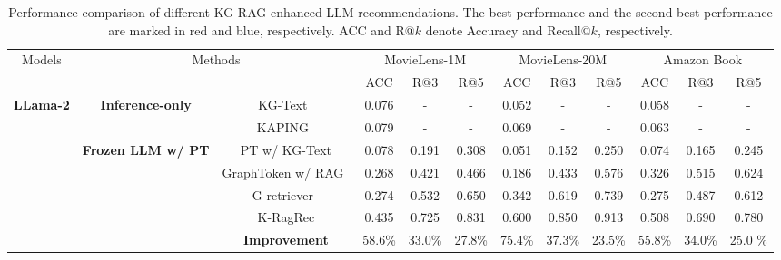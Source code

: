 
\begin{table}[t]
\centering
\vskip -0.150in
  \caption{Performance comparison of different KG RAG-enhanced LLM recommendations. 
  The \colorbox{backred!50}{best performance} and the \colorbox{backblue!75}{second-best performance} are marked in red and blue, respectively. ACC and R@$k$ denote
Accuracy and Recall@$k$, respectively.}
  \vskip -0.05in
    \scalebox{0.6}
{
  \begin{adjustbox}{}
    \begin{tabular}{c|c|c|c|c|c|c|c|c|c|c|c}
    \toprule
    \toprule
    \multirow{2}{*}{Models}  & \multicolumn{2}{c|}{\multirow{2}{*}{Methods}} & \multicolumn{3}{c|}{MovieLens-1M}  & \multicolumn{3}{c|}{MovieLens-20M} & \multicolumn{3}{c}{Amazon Book} \\
    \cmidrule{4-12}
    & \multicolumn{2}{c|}{} & \multicolumn{1}{c|}{ACC} & \multicolumn{1}{c|}{R@3} & \multicolumn{1}{c|}{R@5}& \multicolumn{1}{c|}{ACC} & \multicolumn{1}{c|}{R@3} & \multicolumn{1}{c|}{R@5} & \multicolumn{1}{c|}{ACC} & \multicolumn{1}{c|}{R@3} & \multicolumn{1}{c}{R@5} \\
\midrule
    \multirow{10}{*}{\textbf{LLama-2}}&   \multirow{2}{*}{\textbf{Inference-only}} 
    & KG-Text~\citep{wu2023retrieve}& 0.076  & - & -  & 0.052 &  - &  -  &  0.058  &  -  &  -   \\
    & &KAPING~\citep{baek2023knowledge} & 0.079  & -  & - & 0.069 &  - &  -  & 0.063  &   - &   -  \\
    \cmidrule{2-12}
    &\multirow{5}{*}{\textbf{Frozen LLM w/ PT}} &PT w/ KG-Text& 0.078  & 0.191  & 0.308 &0.051  &0.152 &0.250   &0.074   &0.165   &0.245   \\
    & &GraphToken w/ RAG~\citep{perozzi2024let} & 0.268  &  0.421 & 0.466 & 0.186 &0.433 &0.576   &0.326   & 0.515  & 0.624   \\
    & &G-retriever~\citep{he2024g} &  0.274 & 0.532  & 0.650 & 0.342 &0.619  &0.739   &0.275   &0.487   &0.612 \\
     & & K-RagRec & \colorbox{backblue!75}{0.435}  &  \colorbox{backblue!75}{0.725} & 0.831 &0.600  & \colorbox{backblue!75}{0.850} & \colorbox{backblue!75}{0.913}  &  \colorbox{backblue!75}{0.508}  & \colorbox{backblue!75}{0.690}  &  \colorbox{backblue!75}{0.780} \\
    \cmidrule{3-12}
    && \cellcolor{verylightgray} \textbf{Improvement} & \cellcolor{verylightgray}58.6\%  & \cellcolor{verylightgray}33.0\% & \cellcolor{verylightgray}27.8\%  & \cellcolor{verylightgray}75.4\% &  \cellcolor{verylightgray}37.3\% &  \cellcolor{verylightgray}23.5\%  &  \cellcolor{verylightgray}55.8\%  & \cellcolor{verylightgray}34.0\%   &  \cellcolor{verylightgray}25.0 \%  \\

\end{tabular}
\end{adjustbox}}
\end{table}

